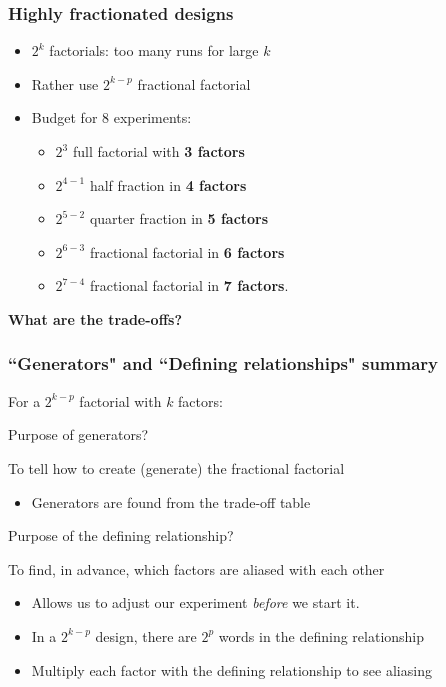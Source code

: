 \begin{frame}\frametitle{Highly fractionated designs}
	\begin{itemize}
		\item	$2^k$ factorials: too many runs for large $k$
		\item	Rather use $2^{k-p}$ fractional factorial
		\item	Budget for 8 experiments:
		\begin{itemize}
			\item	$2^3$ full factorial with \textbf{3 factors}
			\item	$2^{4-1}$ half fraction in \textbf{4 factors}
			\item	$2^{5-2}$ quarter fraction in \textbf{5 factors}
			\item	$2^{6-3}$ fractional factorial in \textbf{6 factors}
			\item	$2^{7-4}$ fractional factorial in \textbf{7 factors}.
		\end{itemize}
	\end{itemize}

	\textbf{What are the trade-offs?}
\end{frame}

\begin{frame}\frametitle{``Generators" and ``Defining relationships" summary}

	For a $2^{k-p}$ factorial with $k$ factors:
	\begin{block}{Purpose of generators?}
		\begin{center}
			To tell how to create (generate) the fractional factorial
		\end{center}
	\end{block}
	\begin{itemize}
		\item	Generators are found from the trade-off table
	\end{itemize}
	\begin{block}{Purpose of the defining relationship?}
		\begin{center}
			To find, in advance, which factors are aliased with each other
		\end{center}
	\end{block}
	\begin{itemize}
		\item	Allows us to adjust our experiment \emph{before} we start it.
		\item	In a $2^{k-p}$ design, there are $2^p$ words in the defining relationship
		\item	Multiply each factor with the defining relationship to see aliasing
	\end{itemize}
\end{frame}

